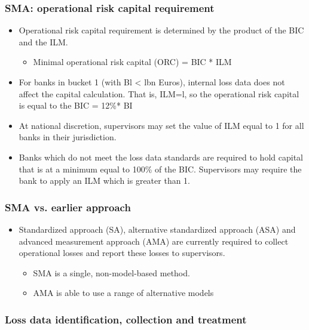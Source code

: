 \subsubsection{SMA: operational risk capital requirement}
\begin{itemize}
\item Operational risk capital requirement is determined by the product of the BIC and the ILM.
    \begin{itemize}
    \item Minimal operational risk capital (ORC) = BIC * ILM
    \end{itemize}
    
\item For banks in bucket 1 (with Bl < lbn Euros), internal loss data does not affect the capital calculation. That is, ILM=l, so the operational risk capital is equal to the BIC = 12\%* BI
\item At national discretion, supervisors may set the value of ILM equal to 1 for all banks in their jurisdiction.
\item Banks which do not meet the loss data standards are required to hold capital that is at a minimum equal to 100\% of the BIC. Supervisors may require the bank to apply an ILM which is greater than 1.
\end{itemize}


\subsubsection{SMA vs. earlier approach}
\begin{itemize}
\item Standardized approach (SA), alternative standardized approach (ASA) and advanced measurement approach (AMA) are currently required to collect operational losses and report these losses to supervisors.
    \begin{itemize}
    \item SMA is a single, non-model-based method.
    \item AMA is able to use a range of alternative models
    \end{itemize}
\end{itemize}


\subsubsection{Loss data identification, collection and treatment}

